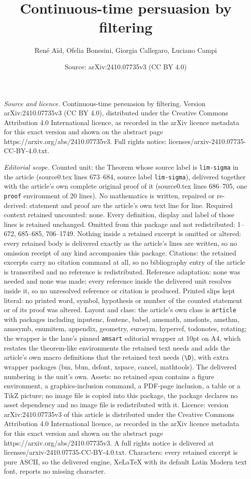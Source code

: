\documentclass[10pt,a4paper]{amsart}
\title[Continuous-time persuasion by filtering]{Continuous-time persuasion by filtering}
\author{Ren\'e A\"id, Ofelia Bonesini, Giorgia Callegaro, Luciano Campi}
\date{Source: arXiv:2410.07735v3 (CC BY 4.0)}
\begin{document}
\maketitle

\noindent\emph{Source and licence.} Continuous-time persuasion by filtering. Version arXiv:2410.07735v3 (CC BY 4.0), distributed under the Creative Commons Attribution 4.0 International licence, as recorded in the arXiv licence metadata for this exact version and shown on the abstract page https://arxiv.org/abs/2410.07735v3. Full rights notice: licenses/arxiv-2410.07735-CC-BY-4.0.txt.\par\smallskip

\noindent\textit{Editorial scope.} Counted unit: the Theorem whose source label is \texttt{lim-sigma} in the article (source0.tex lines 673--684, source label \texttt{lim-sigma}), delivered together with the article's own complete original proof of it (source0.tex lines 686--705, one \texttt{proof} environment of 20 lines). No mathematics is written, repaired or re-derived: statement and proof are the article's own text line for line. Required context retained uncounted: none. Every definition, display and label of those lines is retained unchanged. Omitted from this package and not redistributed: 1--672, 685--685, 706--1749. Nothing inside a retained excerpt is omitted or altered: every retained body is delivered exactly as the article's lines are written, so no omission receipt of any kind accompanies this package. Citations: the retained excerpts carry no citation command at all, so no bibliography entry of the article is transcribed and no reference is redistributed. Reference adaptation: none was needed and none was made; every reference inside the delivered unit resolves inside it, so no unresolved reference or citation is produced. Printed slips kept literal: no printed word, symbol, hypothesis or number of the counted statement or of its proof was altered. Layout and class: the article's own class is \texttt{article} with packages including inputenc, fontenc, babel, amsmath, amsfonts, amsthm, amssymb, enumitem, appendix, geometry, eurosym, hyperref, todonotes, rotating; the wrapper is the lane's pinned \texttt{amsart} editorial wrapper at 10pt on A4, which restates the theorem-like environments the retained text needs and adds the article's own macro definitions that the retained text needs (\texttt{\textbackslash D}), with extra wrapper packages (bm, bbm, dsfont, xspace, cancel, mathtools). The delivered numbering is the unit's own. Assets: no retained span contains a figure environment, a graphics-inclusion command, a PDF-page inclusion, a table or a TikZ picture; no image file is copied into this package, the package declares no asset dependency and no image file is redistributed with it. Licence: version arXiv:2410.07735v3 of this article is distributed under the Creative Commons Attribution 4.0 International licence, as recorded in the arXiv licence metadata for this exact version and shown on the abstract page https://arxiv.org/abs/2410.07735v3. A full rights notice is delivered at licenses/arxiv-2410.07735-CC-BY-4.0.txt. Characters: every retained excerpt is pure ASCII, so the delivered engine, XeLaTeX with its default Latin Modern text font, reports no missing character.
\end{document}
